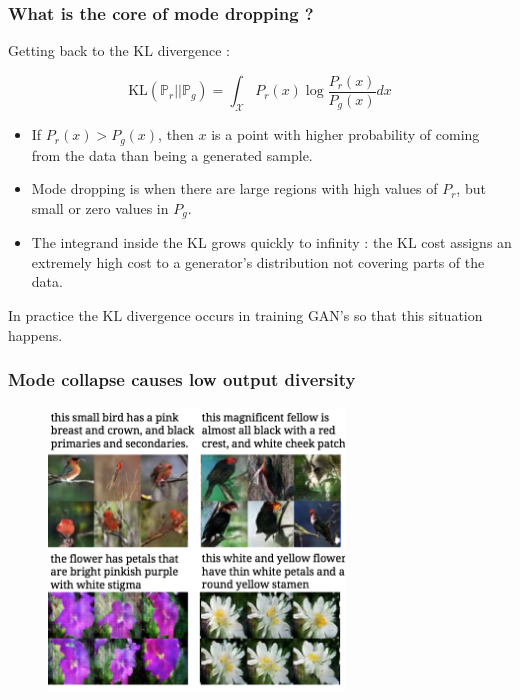 \documentclass[french,9pt]{beamer}
\begin{document}
\begin{frame}
\frametitle{What is the core of mode dropping ?}

Getting back to the $\text{KL}$ divergence :

$$\text{KL}(\mathbb{P}_{r}||\mathbb{P}_{g})= \int_{\mathcal{X}} P_{r}(x) \log \frac{ P_{r}(x)}{ P_{g}(x)} dx$$

\begin{itemize}
\item If $P_{r}(x) > P_{g}(x)$, then $x$ is a point with higher probability of coming from the data than being a generated sample.
\item Mode dropping is when there are large regions with high values of $P_{r}$, but small or zero values in $P_{g}$.
\item The integrand inside the KL grows quickly to infinity :  the $\text{KL}$ cost assigns an extremely high cost to a generator’s distribution not covering parts of the data.
\end{itemize}

In practice the $\text{KL}$ divergence occurs in training GAN's so that this situation happens.


\end{frame}




\begin{frame}
\frametitle{Mode collapse causes low output diversity}
 \begin{figure}
  \begin{center}
    \includegraphics[width=0.7\textwidth]{fig/diversity}
  \end{center}
\end{figure}
\end{frame}
\end{document}
